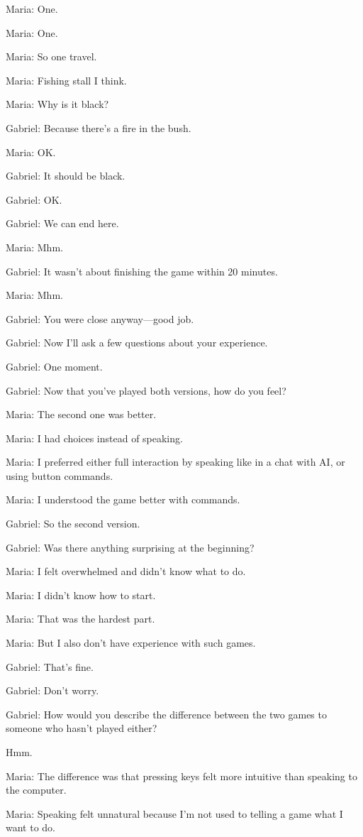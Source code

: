 Maria: One.

Maria: One.

Maria: So one travel.

Maria: Fishing stall I think.

Maria: Why is it black?

Gabriel: Because there’s a fire in the bush.

Maria: OK.

Gabriel: It should be black.

Gabriel: OK.

Gabriel: We can end here.

Maria: Mhm.

Gabriel: It wasn’t about finishing the game within 20 minutes.

Maria: Mhm.

Gabriel: You were close anyway—good job.

Gabriel: Now I’ll ask a few questions about your experience.

Gabriel: One moment.

Gabriel: Now that you’ve played both versions, how do you feel?

Maria: The second one was better.

Maria: I had choices instead of speaking.

Maria: I preferred either full interaction by speaking like in a chat with AI, or using button commands.

Maria: I understood the game better with commands.

Gabriel: So the second version.

Gabriel: Was there anything surprising at the beginning?

Maria: I felt overwhelmed and didn’t know what to do.

Maria: I didn’t know how to start.

Maria: That was the hardest part.

Maria: But I also don’t have experience with such games.

Gabriel: That’s fine.

Gabriel: Don’t worry.

Gabriel: How would you describe the difference between the two games to someone who hasn’t played either?

Hmm.

Maria: The difference was that pressing keys felt more intuitive than speaking to the computer.

Maria: Speaking felt unnatural because I’m not used to telling a game what I want to do.

